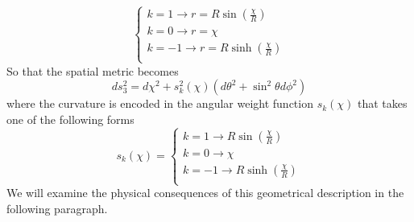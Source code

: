 \documentclass[11pt, a4paper,oneside,openright]{book}
\numberwithin{equation}{section}
\begin{document}
\begin{displaymath}
\left \{ \begin{array}{l}k=1\rightarrow r=R\sin{\left(\frac{\chi}{R}\right)} \\ 
k=0\rightarrow r=\chi \\ 
k=-1 \rightarrow r=R\sinh{\left(\frac{\chi}{R}\right)} \\
 \end{array}  \right.  
\end{displaymath}
So that the spatial metric becomes 
\begin{equation}
ds_3^2=d\chi^2+s^2_k(\chi)(d\theta^2 + \sin^2{\theta}d\phi^2)
\end{equation}
where the curvature is encoded in the angular weight function $s_k(\chi)$ that takes one of the following forms 
\begin{displaymath}
s_k(\chi)=\left \{ \begin{array}{l}k=1\rightarrow R\sin{\left(\frac{\chi}{R}\right)} \\ 
k=0\rightarrow \chi \\ 
k=-1 \rightarrow R\sinh{\left(\frac{\chi}{R}\right)} \\
 \end{array}  \right.  
\end{displaymath}
We will examine the physical consequences of this geometrical description in the following paragraph. 
\end{document}
